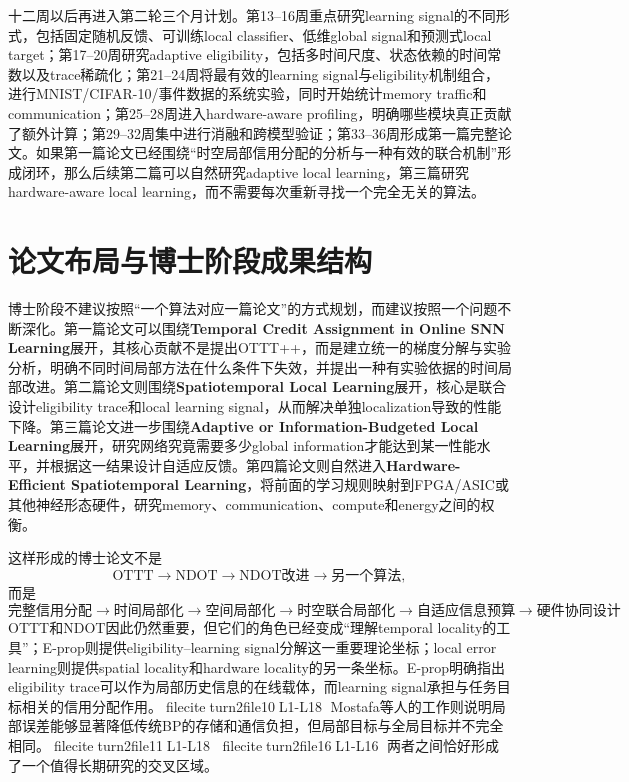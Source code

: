 \documentclass[journal,12pt,onecolumn]{IEEEtran}
\begin{document}
十二周以后再进入第二轮三个月计划。第13--16周重点研究learning signal的不同形式，包括固定随机反馈、可训练local classifier、低维global signal和预测式local target；第17--20周研究adaptive eligibility，包括多时间尺度、状态依赖的时间常数以及trace稀疏化；第21--24周将最有效的learning signal与eligibility机制组合，进行MNIST/CIFAR-10/事件数据的系统实验，同时开始统计memory traffic和communication；第25--28周进入hardware-aware profiling，明确哪些模块真正贡献了额外计算；第29--32周集中进行消融和跨模型验证；第33--36周形成第一篇完整论文。如果第一篇论文已经围绕“时空局部信用分配的分析与一种有效的联合机制”形成闭环，那么后续第二篇可以自然研究adaptive local learning，第三篇研究hardware-aware local learning，而不需要每次重新寻找一个完全无关的算法。

\section{论文布局与博士阶段成果结构}

博士阶段不建议按照“一个算法对应一篇论文”的方式规划，而建议按照一个问题不断深化。第一篇论文可以围绕\textbf{Temporal Credit Assignment in Online SNN Learning}展开，其核心贡献不是提出OTTT++，而是建立统一的梯度分解与实验分析，明确不同时间局部方法在什么条件下失效，并提出一种有实验依据的时间局部改进。第二篇论文则围绕\textbf{Spatiotemporal Local Learning}展开，核心是联合设计eligibility trace和local learning signal，从而解决单独localization导致的性能下降。第三篇论文进一步围绕\textbf{Adaptive or Information-Budgeted Local Learning}展开，研究网络究竟需要多少global information才能达到某一性能水平，并根据这一结果设计自适应反馈。第四篇论文则自然进入\textbf{Hardware-Efficient Spatiotemporal Learning}，将前面的学习规则映射到FPGA/ASIC或其他神经形态硬件，研究memory、communication、compute和energy之间的权衡。

这样形成的博士论文不是
\[
\text{OTTT}\rightarrow\text{NDOT}\rightarrow\text{NDOT改进}\rightarrow\text{另一个算法},
\]
而是
\[
\boxed{
\text{完整信用分配}
\rightarrow
\text{时间局部化}
\rightarrow
\text{空间局部化}
\rightarrow
\text{时空联合局部化}
\rightarrow
\text{自适应信息预算}
\rightarrow
\text{硬件协同设计}
}.
\]
OTTT和NDOT因此仍然重要，但它们的角色已经变成“理解temporal locality的工具”；E-prop则提供eligibility--learning signal分解这一重要理论坐标；local error learning则提供spatial locality和hardware locality的另一条坐标。E-prop明确指出eligibility trace可以作为局部历史信息的在线载体，而learning signal承担与任务目标相关的信用分配作用。fileciteturn2file10L1-L18 Mostafa等人的工作则说明局部误差能够显著降低传统BP的存储和通信负担，但局部目标与全局目标并不完全相同。fileciteturn2file11L1-L18 fileciteturn2file16L1-L16 两者之间恰好形成了一个值得长期研究的交叉区域。
\end{document}
